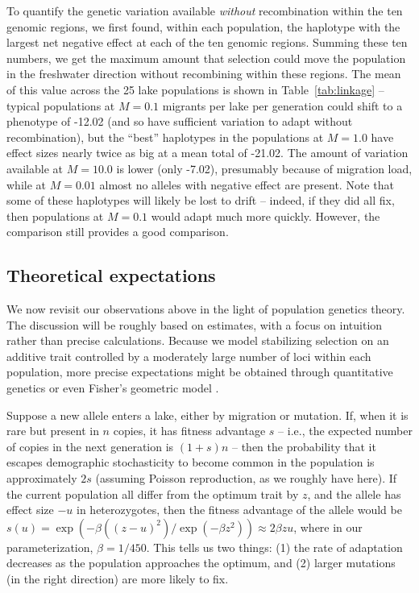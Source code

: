 \documentclass{article}
\begin{document}
To quantify the genetic variation available \emph{without} recombination within the ten genomic regions,
we first found, within each population, the haplotype with the largest net negative effect
at each of the ten genomic regions.
Summing these ten numbers, 
we get the maximum amount that selection could move the population in the freshwater direction
without recombining {within} these regions.
The mean of this value across the 25 lake populations is shown 
in Table~\ref{tab:linkage} --
typical populations at $M=0.1$ migrants per lake per generation could shift to a phenotype of -12.02
(and so have sufficient variation to adapt without recombination),
but the ``best'' haplotypes in the populations at $M=1.0$ have effect sizes nearly twice as big at a mean total of -21.02.
The amount of variation available at $M=10.0$ is lower (only -7.02),
presumably because of migration load, while at $M=0.01$ almost no alleles with negative effect are present.
Note that some of these haplotypes will likely be lost to drift
-- indeed, if they did all fix, then populations at $M=0.1$ would adapt much more quickly.
However, the comparison still provides a good comparison.

\subsection*{Theoretical expectations}

We now revisit our observations above
in the light of population genetics theory.
The discussion will be roughly based on estimates,
with a focus on intuition rather than precise calculations.
Because we model stabilizing selection on an additive trait
controlled by a moderately large number of loci within each population,
more precise expectations might be obtained through quantitative genetics \citep{svardal2014general}
or even Fisher's geometric model \citep{barton2001hybridization,chevin2014niche}.

Suppose a new allele enters a lake, either by migration or mutation. 
If, when it is rare but present in $n$ copies, it has fitness advantage $s$ 
-- i.e., the expected number of copies in the next generation is $(1+s)n$ 
-- then the probability that it escapes demographic stochasticity to become common in the population 
is approximately $2s$ \citep{lambert2006probability,haldane1927mathematical}
(assuming Poisson reproduction, as we roughly have here).
If the current population all differ from the optimum trait by $z$, 
and the allele has effect size $-u$ in heterozygotes, 
then the fitness advantage of the allele would be $s(u) = \exp(-\beta((z - u)^2) / \exp( - \beta z^2)) \approx 2 \beta z u$, where in our parameterization, $\beta = 1 / 450$. 
This tells us two things: (1) the rate of adaptation decreases as the population approaches the optimum, and (2) larger mutations (in the right direction) are more likely to fix.
\end{document}

